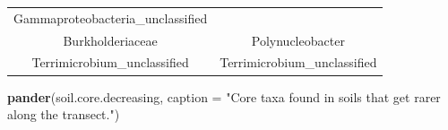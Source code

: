 \documentclass[]{article}
\newenvironment{Shaded}{\begin{snugshade}}{\end{snugshade}}
\newcommand{\KeywordTok}[1]{\textcolor[rgb]{0.13,0.29,0.53}{\textbf{#1}}}
\newcommand{\DataTypeTok}[1]{\textcolor[rgb]{0.13,0.29,0.53}{#1}}
\newcommand{\StringTok}[1]{\textcolor[rgb]{0.31,0.60,0.02}{#1}}
\newcommand{\NormalTok}[1]{#1}
\begin{document}
\begin{longtable}[]{@{}cc@{}}
\begin{minipage}[t]{0.46\columnwidth}
Gammaproteobacteria\_unclassified\strut
\end{minipage}\tabularnewline
\begin{minipage}[t]{0.46\columnwidth}\centering\strut
Burkholderiaceae\strut
\end{minipage} & \begin{minipage}[t]{0.46\columnwidth}\centering\strut
Polynucleobacter\strut
\end{minipage}\tabularnewline
\begin{minipage}[t]{0.46\columnwidth}\centering\strut
Terrimicrobium\_unclassified\strut
\end{minipage} & \begin{minipage}[t]{0.46\columnwidth}\centering\strut
Terrimicrobium\_unclassified\strut
\end{minipage}\tabularnewline
\bottomrule
\end{longtable}

\begin{Shaded}
\begin{Highlighting}[]
\KeywordTok{pander}\NormalTok{(soil.core.decreasing, }\DataTypeTok{caption =} \StringTok{"Core taxa found in soils that get rarer along the transect."}\NormalTok{)}
\end{Highlighting}
\end{Shaded}
\end{document}
